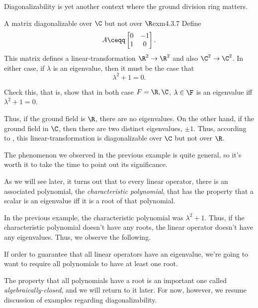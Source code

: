 Diagonalizability is yet another context where the ground division ring matters.
\begin{exm}{A matrix diagonalizable over $\C$ but not over $\R$}{exm4.3.7}
	Define
	\begin{equation}
		A\ceqq \begin{bmatrix}0 & -1 \\ 1 & 0\end{bmatrix}.
	\end{equation}
	This matrix defines a linear-transformation $\R ^2\rightarrow \R ^2$ and also $\C ^2\rightarrow \C ^2$.  In either case, if $\lambda$ is an eigenvalue, then it must be the case that
	\begin{equation}
		\lambda ^2+1=0.
	\end{equation}
	\begin{exr}[breakable=false]{}{}
		Check this, that is, show that in both case $F=\R ,\C$, $\lambda \in \F$ is an eigenvalue iff $\lambda ^2+1=0$.
	\end{exr}

	Thus, if the ground field is $\R$, there are no eigenvalues.  On the other hand, if the ground field in $\C$, then there are two distinct eigenvalues, $\pm 1$.  Thus, according to , this linear-transformation is diagonalizable over $\C$ but not over $\R$.
\end{exm}
The phenomenon we observed in the previous example is quite general, so it's worth it to take the time to point out its significance.
\begin{displayquote}
	As we will see later, it turns out that to every linear operator, there is an associated polynomial, the \emph{characteristic polynomial}, that has the property that a scalar is an eigenvalue iff it is a root of that polynomial. 
\end{displayquote}
In the previous example, the characteristic polynomial was $\lambda ^2+1$.  Thus, if the characteristic polynomial doesn't have any roots, the linear operator doesn't have any eigenvalues.  Thus, we observe the following.
\begin{displayquote}
	If order to guarantee that all linear operators have an eigenvalue, we're going to want to require all polynomials to have at least one root.
\end{displayquote}
The property that all polynomials have a root is an important one called \emph{algebraically-closed}, and we will return to it later.  For now, however, we resume discussion of examples regarding diagonalizability.
